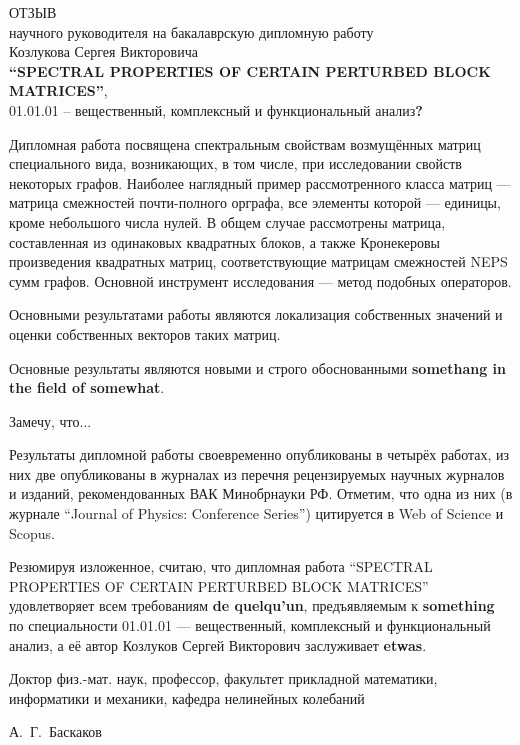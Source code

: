 \documentclass[a4paper]{article}
\begin{document}
\begin{center}
  ОТЗЫВ\\
  научного руководителя на бакалаврскую дипломную работу\\
  Козлукова Сергея Викторовича\\
  \textbf{``SPECTRAL PROPERTIES OF CERTAIN PERTURBED BLOCK MATRICES''},\\
  01.01.01 -- вещественный, комплексный и функциональный анализ\textbf{?}
\end{center}

Дипломная работа посвящена спектральным свойствам возмущённых матриц
специального вида, возникающих, в том числе, при исследовании свойств некоторых
графов. Наиболее наглядный пример рассмотренного класса матриц --- матрица
смежностей почти-полного орграфа,
все элементы которой --- единицы, кроме небольшого числа нулей.
В общем случае рассмотрены матрица, составленная из одинаковых квадратных
блоков, а также Кронекеровы произведения квадратных матриц, соответствующие
матрицам смежностей NEPS сумм графов.
Основной инструмент исследования --- метод подобных операторов.

Основными результатами работы являются локализация собственных значений и оценки
собственных векторов таких матриц.

Основные результаты являются новыми и строго обоснованными
\textbf{somethang in the field of somewhat}.

Замечу, что...

Результаты дипломной работы своевременно опубликованы в четырёх работах, из них
две опубликованы в журналах из перечня рецензируемых научных журналов и изданий,
рекомендованных ВАК Минобрнауки РФ.
Отметим, что одна из них (в журнале ``Journal of Physics: Conference Series'')
цитируется в Web of Science и Scopus.

Резюмируя изложенное, считаю, что дипломная работа
``SPECTRAL PROPERTIES OF
CERTAIN PERTURBED BLOCK MATRICES''
удовлетворяет всем требованиям \textbf{de quelqu'un}, предъявляемым к
\textbf{something} по специальности 01.01.01 --- вещественный, комплексный и
функциональный анализ, а её автор Козлуков Сергей Викторович заслуживает
\textbf{etwas}.


\vfill
\begin{minipage}{12em}
Доктор физ.-мат. наук, профессор,
факультет прикладной математики, информатики и механики,
кафедра нелинейных колебаний
\end{minipage}
\hfill
А.~Г.~Баскаков
\end{document}
